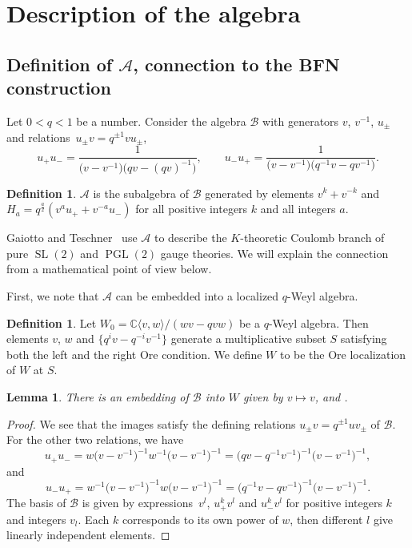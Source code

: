\documentclass[pdftex]{sigma}
\newcommand\CC{\mathbb{C}}
\DeclareMathOperator\SL{SL}
\newcommand{\mc}{\mathcal}
\newcommand{\PGL}{\operatorname{PGL}}
\numberwithin{equation}{section}
\newtheorem{Lemma}[Theorem]{Lemma}
\theoremstyle{definition}
\newtheorem{Definition}[Theorem]{Definition}
\begin{document}
\section{Description of the algebra}
\label{SecAlgebra}

\subsection[Definition of A, connection to the BFN construction]{Definition of $\boldsymbol{\mc{A}}$, connection to the BFN construction}

 Let $0<q<1$ be a number. Consider the algebra $\mc{B}$ with generators $v$, $v^{-1}$, $u_{\pm}$ and relations~${u_{\pm }v=q^{\pm 1}vu_{\pm}}$, \[u_+u_-=\frac{1}{\bigl(v-v^{-1}\bigr)\bigl(qv-(qv)^{-1}\bigr)},\qquad u_-u_+=\frac{1}{\bigl(v-v^{-1}\bigr)\bigl(q^{-1}v-qv^{-1}\bigr)}.\]

\begin{Definition}
\label{DefOfA}
 $\mc{A}$ is the subalgebra of $\mc{B}$ generated by elements $v^k+v^{-k}$ and $H_a=q^{\tfrac a2}(v^au_++v^{-a}u_-)$ for all positive integers $k$ and all integers $a$.
\end{Definition}



Gaiotto and Teschner~\cite{GT} use $\mc{A}$ to describe the $K$-theoretic Coulomb branch of pure $\SL(2)$ and $\PGL(2)$ gauge theories. We will explain the connection from a mathematical point of view below.

First, we note that $\mc{A}$ can be embedded into a localized $q$-Weyl algebra.

\begin{Definition}

 Let $W_0=\CC\langle v,w\rangle/(wv-qvw)$ be a $q$-Weyl algebra. Then elements $v$, $w$ and $\big\{q^iv-q^{-i}{v^{-1}}\big\}$ generate a multiplicative subset $S$ satisfying both the left and the right Ore condition. We define $W$ to be the Ore localization of $W$ at $S$.
\end{Definition}
\begin{Lemma}
\label{LemBIntoW}
 There is an embedding of $\mc{B}$ into $W$ given by $v\mapsto v$,  and .
\end{Lemma}
\begin{proof}
 We see that the images satisfy the defining relations $u_{\pm}v=q^{\pm 1}uv_{\pm}$ of $\mc{B}$. For the other two relations, we have \[u_+u_-=w\bigl(v-v^{-1}\bigr)^{-1}w^{-1}\bigl(v-v^{-1}\bigr)^{-1}=\bigl(qv-q^{-1}v^{-1}\bigr)^{-1}\bigl(v-v^{-1}\bigr)^{-1},\]
and
\[u_-u_+=w^{-1}\bigl(v-v^{-1}\bigr)^{-1}w\bigl(v-v^{-1}\bigr)^{-1}=\bigl(q^{-1}v-qv^{-1}\bigr)^{-1}\bigl(v-v^{-1}\bigr)^{-1}.\] The basis of $\mc{B}$ is given by expressions~$v^l$, $u_+^kv^l$ and $u_-^k v^l$ for positive integers $k$ and integers $v_l$. Each $k$ corresponds to its own power of $w$, then different $l$ give linearly independent elements.
\end{proof}
\end{document}
